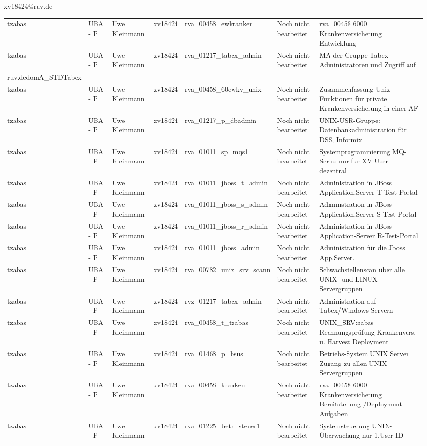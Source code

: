 \documentclass[a4paper,landscape,12pt]{letter}
\begin{document}
\begin{letter}{xv18424@ruv.de\hfill \break}
\begin{tiny}
\begin{longtable}{|p{35mm}|p{15mm}|p{25mm}|p{10mm}|p{40mm}|p{50mm}|p{50mm}|}
tzabas & UBA - P & Uwe Kleinmann & xv18424 & rva\_00458\_ewkranken & Noch nicht bearbeitet & rva\_00458 6000 Krankenversicherung Entwicklung \\
tzabas & UBA - P & Uwe Kleinmann & xv18424 & rva\_01217\_tabex\_admin & Noch nicht bearbeitet & MA der Gruppe Tabex Administratoren und Zugriff auf \\ruv.dedomA\_STDTabex \\
tzabas & UBA - P & Uwe Kleinmann & xv18424 & rva\_00458\_60ewkv\_unix & Noch nicht bearbeitet & Zusammenfassung Unix-Funktionen für private Krankenversicherung in einer AF \\
tzabas & UBA - P & Uwe Kleinmann & xv18424 & rva\_01217\_p\_dbadmin & Noch nicht bearbeitet & UNIX-USR-Gruppe: Datenbankadministration für  DSS, Informix \\
tzabas & UBA - P & Uwe Kleinmann & xv18424 & rva\_01011\_sp\_mqs1 & Noch nicht bearbeitet & Systemprogrammierung MQ-Series nur fur XV-User - dezentral \\
tzabas & UBA - P & Uwe Kleinmann & xv18424 & rva\_01011\_jboss\_t\_admin & Noch nicht bearbeitet & Administration in JBoss Application.Server T-Test-Portal \\
tzabas & UBA - P & Uwe Kleinmann & xv18424 & rva\_01011\_jboss\_s\_admin & Noch nicht bearbeitet & Administration in JBoss Application.Server S-Test-Portal \\
tzabas & UBA - P & Uwe Kleinmann & xv18424 & rva\_01011\_jboss\_r\_admin & Noch nicht bearbeitet & Administration in JBoss Application-Server R-Test-Portal \\
tzabas & UBA - P & Uwe Kleinmann & xv18424 & rva\_01011\_jboss\_admin & Noch nicht bearbeitet & Administration für die Jboss App.Server. \\
tzabas & UBA - P & Uwe Kleinmann & xv18424 & rva\_00782\_unix\_srv\_scann & Noch nicht bearbeitet & Schwachstellenscan über alle UNIX- und LINUX-Servergruppen \\
tzabas & UBA - P & Uwe Kleinmann & xv18424 & rvz\_01217\_tabex\_admin & Noch nicht bearbeitet & Administration auf Tabex/Windows Servern \\
tzabas & UBA - P & Uwe Kleinmann & xv18424 & rva\_00458\_t\_tzabas & Noch nicht bearbeitet & UNIX\_SRV:zabas Rechnungsprüfung Krankenvers. u. Harvest Deployment \\
tzabas & UBA - P & Uwe Kleinmann & xv18424 & rva\_01468\_p\_bsus & Noch nicht bearbeitet & Betriebs-System UNIX Server Zugang zu allen UNIX Servergruppen \\
tzabas & UBA - P & Uwe Kleinmann & xv18424 & rva\_00458\_kranken & Noch nicht bearbeitet & rva\_00458 6000 Krankenversicherung Bereitstellung /Deployment Aufgaben \\
tzabas & UBA - P & Uwe Kleinmann & xv18424 & rva\_01225\_betr\_steuer1 & Noch nicht bearbeitet & Systemsteuerung UNIX-Überwachung nur 1.User-ID \\


\end{longtable}
\end{tiny}
\end{letter}
\end{document}
